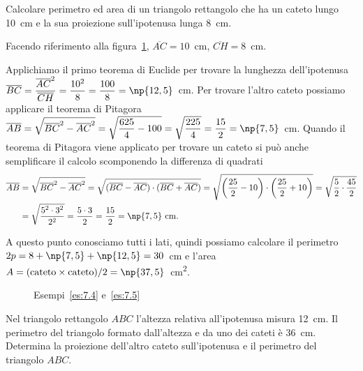 \begin{exrig}
\begin{esempio}\label{es:7.4}
Calcolare perimetro ed area di un triangolo rettangolo che ha un 
cateto lungo 10~cm e la sua proiezione sull'ipotenusa lunga 
8~cm.\vspace{7pt}

Facendo riferimento alla figura~\ref{fig:es7.4}, 
\(\overline{AC}=10\)~cm, \(\overline{CH}=8\)~cm.

Applichiamo il primo teorema di Euclide per trovare la lunghezza 
dell'ipotenusa 
\(\overline{BC}=\dfrac{\overline{AC}^2}{\overline{CH}}=\dfrac{10^2}{8}
=\dfrac{100}{8}=\np{12,5}\)~cm. Per trovare l'altro cateto possiamo 
applicare il teorema di Pitagora 
\(\overline{AB}=\sqrt{\overline{BC}^2-\overline{AC}^2}=\sqrt{\dfrac{625
}{4}-100}=\sqrt{\dfrac{225}{4}}=\dfrac{15}{2}=\np{7,5}\)~cm.
Quando il teorema di Pitagora viene applicato per trovare un cateto 
si può anche semplificare il calcolo scomponendo la differenza di 
quadrati
\begin{align*}
\overline{AB}&=\sqrt{\overline{BC}^2-\overline{AC}^2}=\sqrt{(\overline
{BC}-\overline{AC})\cdot(\overline{BC}+\overline{AC})}=\sqrt{
\left(\dfrac{25}{2}-10\right)\cdot\left(\dfrac{25}{2}+10\right)}=\sqrt
{\dfrac{5}{2}\cdot\dfrac{45}{2}}\\
&=\sqrt{\dfrac{5^2\cdot 3^2}{2^2}}=\dfrac{5\cdot 
3}{2}=\dfrac{15}{2}=\np{7,5}\text{~cm.}
\end{align*}

A questo punto conosciamo tutti i lati, quindi possiamo calcolare il 
perimetro \(2p=8+\np{7,5}+\np{12,5}=30\)~cm e l'area 
\(A=(\text{cateto}\times\text{cateto})/2 = 
\np{37,5}\)~cm\textsuperscript{2}.
\end{esempio}


\begin{inaccessibleblock}
 \begin{figure}[!htb]
	\centering
	\caption{Esempi~\ref{es:7.4} e~\ref{es:7.5}}\label{fig:es7.4}
\end{figure}
\end{inaccessibleblock}

\begin{esempio}\label{es:7.5}
Nel triangolo rettangolo \(ABC\) l'altezza relativa all'ipotenusa 
misura 12~cm. Il perimetro del triangolo formato dall'altezza e da uno 
dei cateti è 36~cm. Determina la proiezione dell'altro cateto 
sull'ipotenusa e il perimetro del triangolo \(ABC\).\vspace{7pt}


\end{esempio}
\end{exrig}
